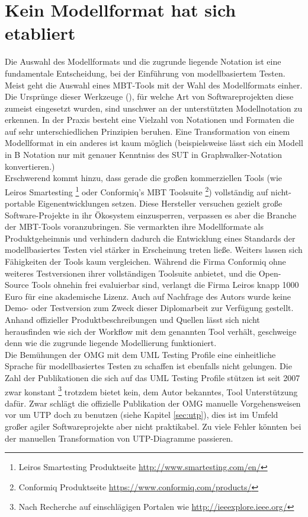 \section{Kein Modellformat hat sich etabliert}
Die Auswahl des Modellformats und die zugrunde liegende Notation ist eine fundamentale Entscheidung, bei der Einführung von modellbasiertem Testen. Meist geht die Auswahl eines MBT-Tools mit der Wahl des Modellformats einher. Die Ursprünge dieser Werkzeuge (), für welche Art von Softwareprojekten diese zumeist eingesetzt wurden, sind unschwer an der unterstützten Modellnotation zu erkennen.  In der Praxis besteht eine Vielzahl von Notationen und Formaten die auf sehr unterschiedlichen Prinzipien beruhen. Eine Transformation von einem Modellformat in ein anderes ist kaum möglich (beispielsweise lässt sich ein Modell in B Notation nur mit genauer Kenntniss des SUT in Graphwalker-Notation konvertieren.)\\
Erschwerend kommt hinzu, dass gerade die großen kommerziellen Tools (wie Leiros Smartesting \footnote{Leiros Smartesting Produktseite \url{http://www.smartesting.com/en/}} oder Conformiq's MBT Toolsuite \footnote{Conformiq Produktseite \url{https://www.conformiq.com/products/}}) vollständig auf nicht-portable Eigenentwicklungen setzen. Diese Hersteller versuchen gezielt große Software-Projekte in ihr Ökosystem einzusperren, verpassen es aber die Branche der MBT-Tools voranzubringen. Sie vermarkten ihre Modellformate als Produktgeheimnis und verhindern dadurch die Entwicklung eines Standards der modellbasiertes Testen viel stärker in Erscheinung treten ließe. Weiters lassen sich Fähigkeiten der Tools kaum vergleichen. Während die Firma Conformiq ohne weiteres Testversionen ihrer vollständigen Toolsuite anbietet, und die Open-Source Tools ohnehin frei evaluierbar sind, verlangt die Firma Leiros knapp 1000 Euro für eine akademische Lizenz. Auch auf Nachfrage des Autors wurde keine Demo- oder Testversion zum Zweck dieser Diplomarbeit zur Verfügung gestellt. Anhand offizieller Produktbeschreibungen und Quellen lässt sich nicht herausfinden wie sich der Workflow mit dem genannten Tool verhält, geschweige denn wie die zugrunde liegende Modellierung funktioniert.\\
Die Bemühungen der OMG mit dem UML Testing Profile eine einheitliche Sprache für modellbasiertes Testen zu schaffen ist ebenfalls nicht gelungen. Die Zahl der Publikationen die sich auf das UML Testing Profile stützen ist seit 2007 zwar konstant \footnote{Nach Recherche auf einschlägigen Portalen wie \url{http://ieeexplore.ieee.org/}} trotzdem bietet kein, dem Autor bekanntes, Tool Unterstützung dafür. Zwar schlägt die offizielle Publikation der OMG\cite{_model-driven_2007} manuelle Vorgehensweisen vor um UTP doch zu benutzen (siehe Kapitel \ref{sec:utp}), dies ist im Umfeld großer agiler Softwareprojekte aber nicht praktikabel. Zu viele Fehler könnten bei der manuellen Transformation von UTP-Diagramme passieren.\\
